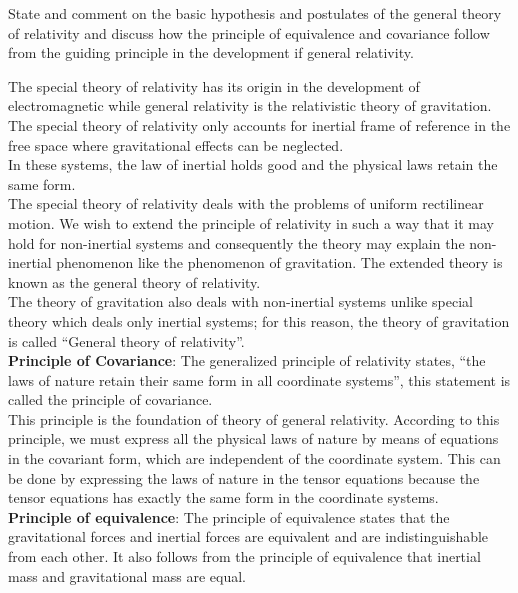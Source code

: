 \documentclass[../main-sheet.tex]{subfiles}
\begin{document}
        \begin{prob}
            State and comment on the basic hypothesis and postulates of the general theory of relativity and discuss how the principle of equivalence and covariance follow from the guiding principle in the development if general relativity.
        \end{prob}
        \begin{soln}
            The special theory of relativity has its origin in the development of electromagnetic while general relativity is the relativistic theory of gravitation. The special theory of relativity only accounts for inertial frame of reference in the free space where gravitational effects can be neglected.\\
            In these systems, the law of inertial holds good and the physical laws retain the same form.\\
            The special theory of relativity deals with the problems of uniform rectilinear motion. We wish to extend the principle of relativity in such a way that it may hold for non-inertial systems and consequently the theory may explain the non-inertial phenomenon like the phenomenon of gravitation. The extended theory is known as the general theory of relativity.\\
            The theory of gravitation also deals with non-inertial systems unlike special theory which deals only inertial systems; for this reason, the theory of gravitation is called ``General theory of relativity''.\\

            \textbf{Principle of Covariance}: The generalized principle of relativity states, ``the laws of nature retain their same form in all coordinate systems'', this statement is called the principle of covariance.\\
            This principle is the foundation of theory of general relativity. According to this principle, we must express all the physical laws of nature by means of equations in the covariant form, which are independent of the coordinate system. This can be done by expressing the laws of nature in the tensor equations because the tensor equations has exactly the same form in the coordinate systems.\\


            \textbf{Principle of equivalence}: The principle of equivalence states that the gravitational forces and inertial forces are equivalent and are indistinguishable from each other. It also follows from the principle of equivalence that inertial mass and gravitational mass are equal.
        \end{soln}
\end{document}
